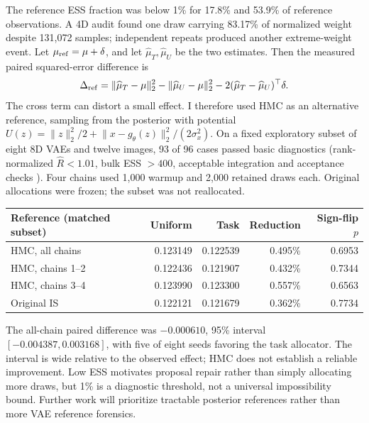 \documentclass[10pt,letterpaper]{article}
\newcommand{\norm}[1]{\lVert #1\rVert_2}
\begin{document}
The reference ESS fraction was below 1\% for 17.8\% and 53.9\% of reference observations. A 4D audit found one draw carrying 83.17\% of normalized weight despite 131,072 samples; independent repeats produced another extreme-weight event. Let $\mu_{\rm ref}=\mu+\delta$, and let $\widehat\mu_T,\widehat\mu_U$ be the two estimates. Then the measured paired squared-error difference is
\begin{equation}
 \Delta_{\rm ref}=\norm{\widehat\mu_T-\mu}^2-\norm{\widehat\mu_U-\mu}^2-2(\widehat\mu_T-\widehat\mu_U)^\top\delta.
\end{equation}
The cross term can distort a small effect. I therefore used HMC \cite{neal2011} as an alternative reference, sampling from the posterior with potential $U(z)=\norm z^2/2+\norm{x-g_\theta(z)}^2/(2\sigma_x^2)$. On a fixed exploratory subset of eight 8D VAEs and twelve images, 93 of 96 cases passed basic diagnostics (rank-normalized $\widehat R<1.01$, bulk ESS $>400$, acceptable integration and acceptance checks \cite{vehtari2021}). Four chains used 1,000 warmup and 2,000 retained draws each. Original allocations were frozen; the subset was not reallocated.
\begin{center}\begin{minipage}{\linewidth}\centering\small
\begin{tabular}{@{}lrrrr@{}}
\toprule
Reference (matched subset)&Uniform&Task&Reduction&Sign-flip $p$\\
\midrule
HMC, all chains&0.123149&0.122539&0.495\%&0.6953\\
HMC, chains 1--2&0.122436&0.121907&0.432\%&0.7344\\
HMC, chains 3--4&0.123990&0.123300&0.557\%&0.6563\\
Original IS&0.122121&0.121679&0.362\%&0.7734\\
\bottomrule
\end{tabular}
\end{minipage}\end{center}
The all-chain paired difference was $-0.000610$, 95\% interval $[-0.004387,0.003168]$, with five of eight seeds favoring the task allocator. The interval is wide relative to the observed effect; HMC does not establish a reliable improvement. Low ESS motivates proposal repair rather than simply allocating more draws, but 1\% is a diagnostic threshold, not a universal impossibility bound. Further work will prioritize tractable posterior references rather than more VAE reference forensics.
\end{document}
